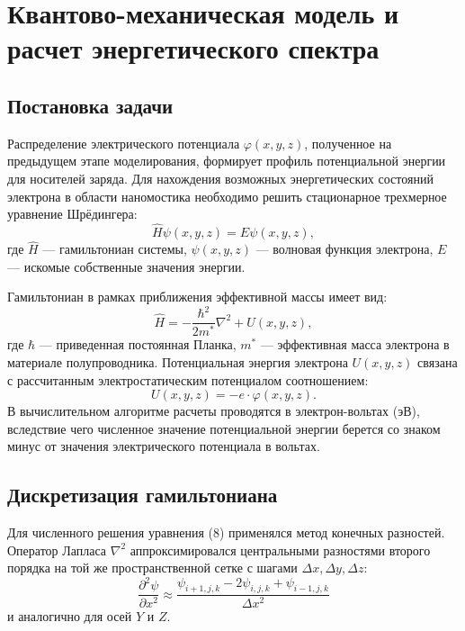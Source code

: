\documentclass[a4paper,14pt]{extreport} %
\begin{document}
\section{Квантово-механическая модель и расчет энергетического спектра}

\subsection{Постановка задачи}
Распределение электрического потенциала $\varphi(x, y, z)$, полученное на предыдущем этапе моделирования, формирует профиль потенциальной энергии для носителей заряда. Для нахождения возможных энергетических состояний электрона в области наномостика необходимо решить стационарное трехмерное уравнение Шрёдингера:
\begin{equation}
    \hat{H} \psi(x,y,z) = E \psi(x,y,z),
\end{equation}
где $\hat{H}$ — гамильтониан системы, $\psi(x,y,z)$ — волновая функция электрона, $E$ — искомые собственные значения энергии. 

Гамильтониан в рамках приближения эффективной массы имеет вид:
\begin{equation}
    \hat{H} = -\frac{\hbar^2}{2 m^*} \nabla^2 + U(x,y,z),
\end{equation}
где $\hbar$ — приведенная постоянная Планка, $m^*$ — эффективная масса электрона в материале полупроводника. Потенциальная энергия электрона $U(x,y,z)$ связана с рассчитанным электростатическим потенциалом соотношением:
\begin{equation}
    U(x,y,z) = -e \cdot \varphi(x,y,z).
\end{equation}
В вычислительном алгоритме расчеты проводятся в электрон-вольтах (эВ), вследствие чего численное значение потенциальной энергии берется со знаком минус от значения электрического потенциала в вольтах.

\subsection{Дискретизация гамильтониана}
Для численного решения уравнения (8) применялся метод конечных разностей. Оператор Лапласа $\nabla^2$ аппроксимировался центральными разностями второго порядка на той же пространственной сетке с шагами $\Delta x, \Delta y, \Delta z$:
\begin{equation}
    \frac{\partial^2 \psi}{\partial x^2} \approx \frac{\psi_{i+1,j,k} - 2\psi_{i,j,k} + \psi_{i-1,j,k}}{\Delta x^2}
\end{equation}
и аналогично для осей $Y$ и $Z$.
\end{document}
